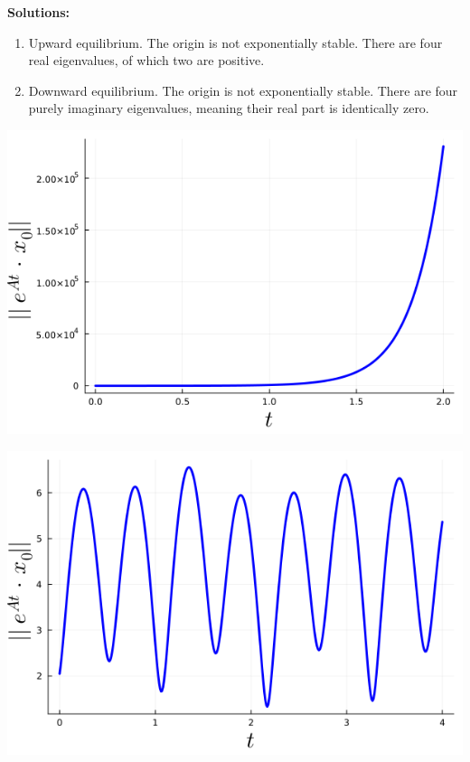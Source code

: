 \textbf{Solutions: }

\begin{enumerate}
\renewcommand{\labelenumi}{(\alph{enumi})}
\setlength{\itemsep}{.2cm}
\item Upward equilibrium. \Ans \quad The origin is not exponentially stable. There are four real eigenvalues, of which two are positive.

\item Downward equilibrium. \Ans \quad The origin is not exponentially stable.  There are four purely imaginary eigenvalues, meaning their real part is identically zero.
\end{enumerate}

\bigskip
\begin{center}
    \begin{minipage}{0.45\columnwidth}
        \includegraphics[width=\linewidth]{graphics/Chap09/NormSolutionX0randomUpwardEquilibrium2LinkArm.png}
    \end{minipage}
    \hfill
    \begin{minipage}{0.45\columnwidth}
        \includegraphics[width=\linewidth]{graphics/Chap09/NormSolutionX0randomDownwardEquilibrium2LinkArm.png}
    \end{minipage}
\end{center}

